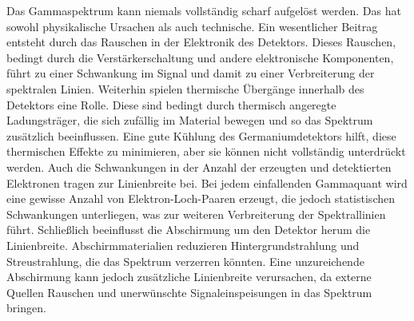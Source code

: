\noindent Das Gammaspektrum kann niemals vollständig scharf aufgelöst werden. Das hat sowohl physikalische Ursachen als auch technische.
Ein wesentlicher Beitrag entsteht durch das Rauschen in der Elektronik des Detektors. Dieses Rauschen, bedingt durch die Verstärkerschaltung und andere elektronische Komponenten, 
führt zu einer Schwankung im Signal und damit zu einer Verbreiterung der spektralen Linien.
Weiterhin spielen thermische Übergänge innerhalb des Detektors eine Rolle. Diese sind bedingt durch thermisch angeregte Ladungsträger, 
die sich zufällig im Material bewegen und so das Spektrum zusätzlich beeinflussen. Eine gute Kühlung des Germaniumdetektors hilft, 
diese thermischen Effekte zu minimieren, aber sie können nicht vollständig unterdrückt werden.
Auch die Schwankungen in der Anzahl der erzeugten und detektierten Elektronen tragen zur Linienbreite bei. 
Bei jedem einfallenden Gammaquant wird eine gewisse Anzahl von Elektron-Loch-Paaren erzeugt, die jedoch statistischen Schwankungen unterliegen, was zur weiteren Verbreiterung der Spektrallinien führt.
Schließlich beeinflusst die Abschirmung um den Detektor herum die Linienbreite. 
Abschirmmaterialien reduzieren Hintergrundstrahlung und Streustrahlung, die das Spektrum verzerren könnten. 
Eine unzureichende Abschirmung kann jedoch zusätzliche Linienbreite verursachen, da externe Quellen Rauschen und unerwünschte Signaleinspeisungen in das Spektrum bringen.





